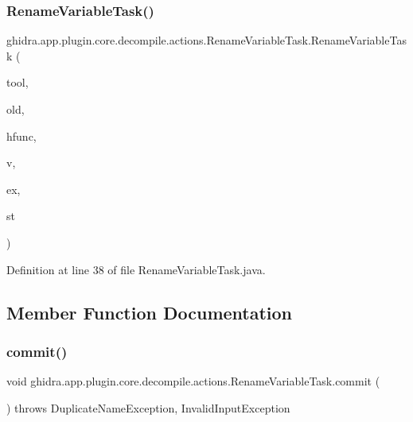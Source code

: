 \subsubsection{\texorpdfstring{RenameVariableTask()}{RenameVariableTask()}}
{\footnotesize\ttfamily ghidra.\+app.\+plugin.\+core.\+decompile.\+actions.\+Rename\+Variable\+Task.\+Rename\+Variable\+Task (\begin{DoxyParamCaption}\item[{Plugin\+Tool}]{tool,  }\item[{String}]{old,  }\item[{High\+Function}]{hfunc,  }\item[{\mbox{\hyperlink{class_high_variable}{High\+Variable}}}]{v,  }\item[{\mbox{\hyperlink{class_varnode}{Varnode}}}]{ex,  }\item[{Source\+Type}]{st }\end{DoxyParamCaption})\hspace{0.3cm}{\ttfamily [inline]}}



Definition at line 38 of file Rename\+Variable\+Task.\+java.



\subsection{Member Function Documentation}
\mbox{\label{classghidra_1_1app_1_1plugin_1_1core_1_1decompile_1_1actions_1_1_rename_variable_task_ae4158a4f03d5b0e48f43bfee4314809b}} 
\subsubsection{\texorpdfstring{commit()}{commit()}}
{\footnotesize\ttfamily void ghidra.\+app.\+plugin.\+core.\+decompile.\+actions.\+Rename\+Variable\+Task.\+commit (\begin{DoxyParamCaption}{ }\end{DoxyParamCaption}) throws Duplicate\+Name\+Exception, Invalid\+Input\+Exception\hspace{0.3cm}{\ttfamily [inline]}}



